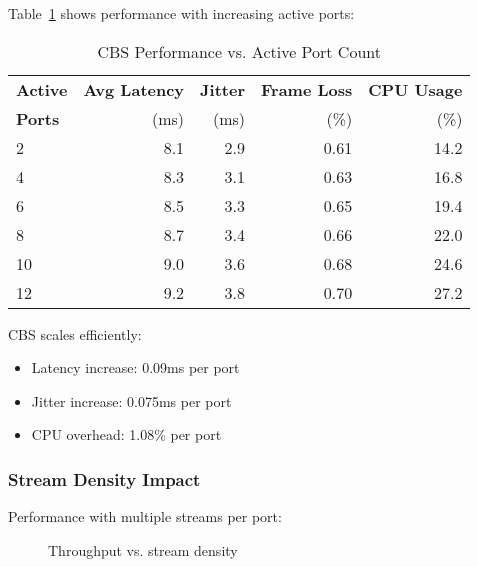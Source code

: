 \documentclass[10pt, journal, compsoc]{IEEEtran}
\begin{document}
Table~\ref{tab:port_scalability} shows performance with increasing active ports:

\begin{table}[h]
\centering
\caption{CBS Performance vs. Active Port Count}
\label{tab:port_scalability}
\begin{tabular}{lrrrr}
\toprule
\textbf{Active} & \textbf{Avg Latency} & \textbf{Jitter} & \textbf{Frame Loss} & \textbf{CPU Usage} \\
\textbf{Ports} & (ms) & (ms) & (\%) & (\%) \\
\midrule
2 & 8.1 & 2.9 & 0.61 & 14.2 \\
4 & 8.3 & 3.1 & 0.63 & 16.8 \\
6 & 8.5 & 3.3 & 0.65 & 19.4 \\
8 & 8.7 & 3.4 & 0.66 & 22.0 \\
10 & 9.0 & 3.6 & 0.68 & 24.6 \\
12 & 9.2 & 3.8 & 0.70 & 27.2 \\
\bottomrule
\end{tabular}
\end{table}

CBS scales efficiently:
\begin{itemize}
    \item Latency increase: 0.09ms per port
    \item Jitter increase: 0.075ms per port
    \item CPU overhead: 1.08\% per port
\end{itemize}

\subsubsection{Stream Density Impact}

Performance with multiple streams per port:

\begin{figure}[h]
\centering
{}
\caption{Throughput vs. stream density}
\label{fig:stream_density}
\end{figure}
\end{document}
